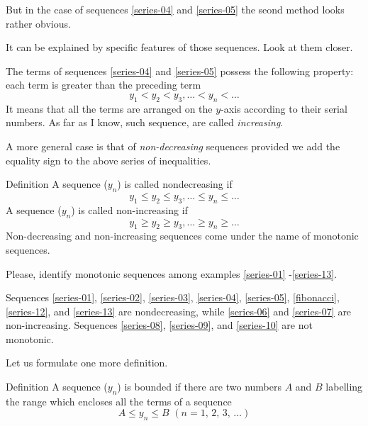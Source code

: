 {\rdr But in the case of sequences \eqref{series-04} and \eqref{series-05} the seond method looks rather obvious.

\athr It can be explained by specific features of those sequences. Look at them closer.

\rdr The terms of sequences  \eqref{series-04} and \eqref{series-05} possess the following property: each term is greater than the preceding term
\begin{equation*}%
y_{1} < y_{2} < y_{3}, \ldots < y_{n} < \ldots
\end{equation*}
It means that all the terms are arranged on the $y$-axis according to their serial numbers. As far as I know, such sequence, are called \emph{increasing}.

\athr A more general case is that of \emph{non-decreasing} sequences provided we add the equality sign to the above series of inequalities.
\begin{mytheo}{Definition}
A sequence ($y_{n}$) is called nondecreasing if
\begin{equation*}%
y_{1} \leqslant y_{2} \leqslant y_{3}, \ldots \leqslant y_{n} \leqslant \ldots
\end{equation*}
A sequence ($y_{n}$) is called non-increasing if
\begin{equation*}%
y_{1} \geqslant y_{2} \geqslant y_{3}, \ldots \geqslant y_{n} \geqslant \ldots
\end{equation*}
Non-decreasing and non-increasing sequences come under the name of monotonic sequences.
\end{mytheo}
Please, identify monotonic sequences among examples \eqref{series-01} -\eqref{series-13}.

\rdr Sequences \eqref{series-01}, \eqref{series-02}, \eqref{series-03}, \eqref{series-04}, \eqref{series-05}, \eqref{fibonacci}, \eqref{series-12}, and \eqref{series-13} are nondecreasing, while \eqref{series-06} and \eqref{series-07} are non-increasing. Sequences \eqref{series-08}, \eqref{series-09}, and \eqref{series-10} are not monotonic.

\athr Let us formulate one more definition.
\begin{mytheo}{Definition}
A sequence ($y_{n}$) is bounded if there are two numbers $A$ and $B$
labelling the range which encloses all the terms of a sequence
\begin{equation*}%
A \leqslant y_{n} \leqslant B \,\, (n = 1, \, 2, \, 3, \, \ldots)
\end{equation*}
\end{mytheo}

}
